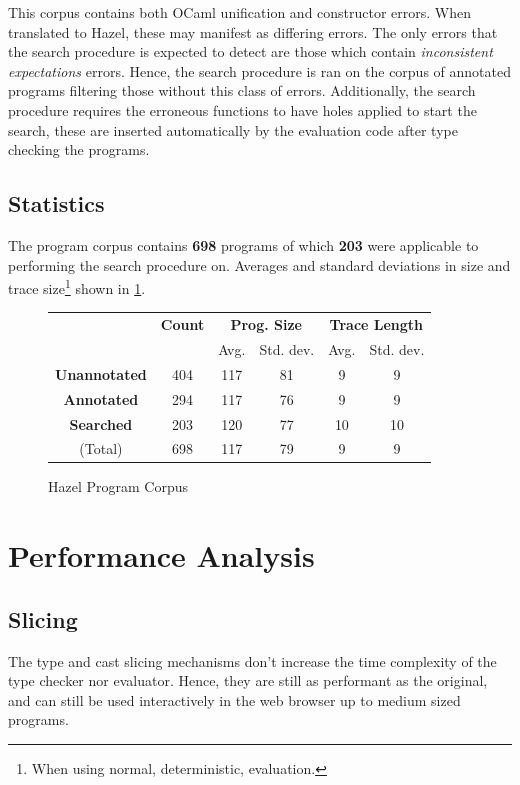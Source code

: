 This corpus contains both OCaml unification and constructor errors. When translated to Hazel, these may manifest as differing errors. The only errors that the search procedure is expected to detect are those which contain \textit{inconsistent expectations} errors. Hence, the search procedure is ran on the corpus of annotated programs filtering those without this class of errors. Additionally, the search procedure requires the erroneous functions to have holes applied to start the search, these are inserted automatically by the evaluation code after type checking the programs.


\subsection{Statistics}
The program corpus contains \textbf{698} programs of which \textbf{203} were applicable to performing the search procedure on. Averages and standard deviations in size and trace size\footnote{When using normal, deterministic, evaluation.} shown in \cref{fig:CorpusStats}.
\begin{figure}
\centering
\begin{tabular}{c|ccccc}
& \textbf{Count} & \multicolumn{2}{c}{\textbf{Prog. Size}}& \multicolumn{2}{c}{\textbf{Trace Length}}\\
&  & Avg. & Std. dev. & Avg. & Std. dev.\\
\hline
\textbf{Unannotated} &404 &117 &81 &9&9\\
\textbf{Annotated} &294 &117 &76 &9&9\\
\textbf{Searched} &203 &120 &77 &10 &10\\
\hline
(Total)  &698 &117 &79 &9 &9\\
\end{tabular}
\caption{Hazel Program Corpus}
\label{fig:CorpusStats}
\end{figure}

\section{Performance Analysis}\label{sec:PerformanceAnalysis}

\subsection{Slicing}
The type and cast slicing mechanisms don't increase the time complexity of the type checker nor evaluator. Hence, they are still as performant as the original, and can still be used interactively in the web browser up to medium sized programs.

